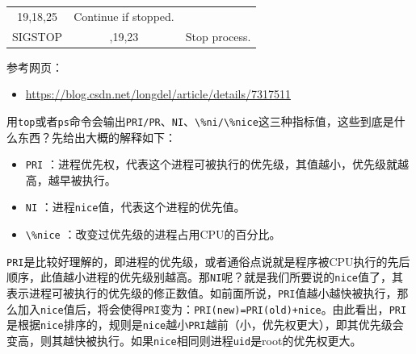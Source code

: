 \documentclass[doctor,openright,twoside]{sjtuthesis}
\providecommand{\tightlist}{%
    \setlength{\itemsep}{0pt}\setlength{\parskip}{0pt}}
\newcommand{\passthrough}[1]{#1}
\theoremstyle{plain}
\theoremstyle{definition}
\theoremstyle{remark}
\theoremstyle{ocrenumbox}
\theoremstyle{plain}
\begin{document}
\begin{longtable}[]{@{}ccl@{}}
\begin{minipage}[t]{0.12\columnwidth}
19,18,25\strut
\end{minipage} & \begin{minipage}[t]{0.70\columnwidth}\raggedright
Continue if stopped.\strut
\end{minipage}\tabularnewline
\begin{minipage}[t]{0.10\columnwidth}\centering
SIGSTOP\strut
\end{minipage} & \begin{minipage}[t]{0.12\columnwidth}\centering
17,19,23\strut
\end{minipage} & \begin{minipage}[t]{0.70\columnwidth}\raggedright
Stop process.\strut
\end{minipage}\tabularnewline
\bottomrule
\end{longtable}

参考网页：

\begin{itemize}
\tightlist
\item
  \url{https://blog.csdn.net/longdel/article/details/7317511}
\end{itemize}

用\passthrough{\lstinline!top!}或者\passthrough{\lstinline!ps!}命令会输出\passthrough{\lstinline!PRI/PR!}、\passthrough{\lstinline!NI!}、\passthrough{\lstinline!\%ni/\%nice!}这三种指标值，这些到底是什么东西？先给出大概的解释如下：

\begin{itemize}
\tightlist
\item
  \passthrough{\lstinline!PRI!} ：进程优先权，代表这个进程可被执行的优先级，其值越小，优先级就越高，越早被执行。
\item
  \passthrough{\lstinline!NI!} ：进程\passthrough{\lstinline!nice!}值，代表这个进程的优先值。
\item
  \passthrough{\lstinline!\%nice!} ：改变过优先级的进程占用CPU的百分比。
\end{itemize}

\passthrough{\lstinline!PRI!}是比较好理解的，即进程的优先级，或者通俗点说就是程序被CPU执行的先后顺序，此值越小进程的优先级别越高。那\passthrough{\lstinline!NI!}呢？就是我们所要说的\passthrough{\lstinline!nice!}值了，其表示进程可被执行的优先级的修正数值。如前面所说，\passthrough{\lstinline!PRI!}值越小越快被执行，那么加入\passthrough{\lstinline!nice!}值后，将会使得\passthrough{\lstinline!PRI!}变为：\passthrough{\lstinline!PRI(new)=PRI(old)+nice!}。由此看出，\passthrough{\lstinline!PRI!}是根据\passthrough{\lstinline!nice!}排序的，规则是\passthrough{\lstinline!nice!}越小\passthrough{\lstinline!PRI!}越前（小，优先权更大），即其优先级会变高，则其越快被执行。如果\passthrough{\lstinline!nice!}相同则进程\passthrough{\lstinline!uid!}是root的优先权更大。
\end{document}

